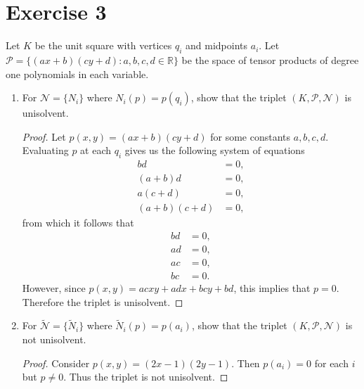 \documentclass{article}
\begin{document}
\section*{Exercise 3}
Let $K$ be the unit square with vertices $q_i$ and midpoints $a_i$.
Let $\mathcal P = \{(ax+b)(cy+d) : a,b,c,d\in\mathbb R\}$ be the space of tensor products of degree one polynomials in each variable.
\begin{enumerate}
	\item For $\mathcal N = \{N_i\}$ where $N_i(p) = p(q_i)$, show that the triplet $(K,\mathcal P, \mathcal N)$ is unisolvent.
	      \begin{proof}
		      Let $p(x,y) = (ax+b)(cy+d)$ for some constants $a,b,c,d$.
		      Evaluating $p$ at each $q_i$ gives us the following system of equations
		      \begin{align*}
			      bd         & = 0, \\
			      (a+b)d     & = 0, \\
			      a(c+d)     & = 0, \\
			      (a+b)(c+d) & = 0,
		      \end{align*}
		      from which it follows that
		      \begin{align*}
			      bd & = 0, \\
			      ad & = 0, \\
			      ac & = 0, \\
			      bc & = 0.
		      \end{align*}
		      However, since $p(x,y) = acxy + adx + bcy + bd$, this implies that $p = 0$.
		      Therefore the triplet is unisolvent.
	      \end{proof}
	\item For $\widetilde{\mathcal N} = \{\widetilde N_i\}$ where $\widetilde N_i(p) = p(a_i)$, show that the triplet $(K,\mathcal P, \mathcal N)$ is not unisolvent.
	      \begin{proof}
		      Consider $p(x,y) = (2x-1)(2y-1)$.
		      Then $p(a_i) = 0$ for each $i$ but $p \neq 0$.
		      Thus the triplet is not unisolvent.
	      \end{proof}
\end{enumerate}
\end{document}
